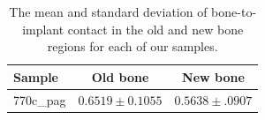 \begin{table}
    \caption{The mean and standard deviation of bone-to-implant contact in the old and new bone regions for each of our samples.}
    \label{tab:bic}
    \centering
    \begin{tabular}{lcc}
        \toprule
        Sample & Old bone & New bone \\
        \midrule
        770c\_pag & $0.6519 \pm 0.1055$ & $0.5638 \pm .0907$ \\
        \bottomrule
    \end{tabular}
\end{table}

